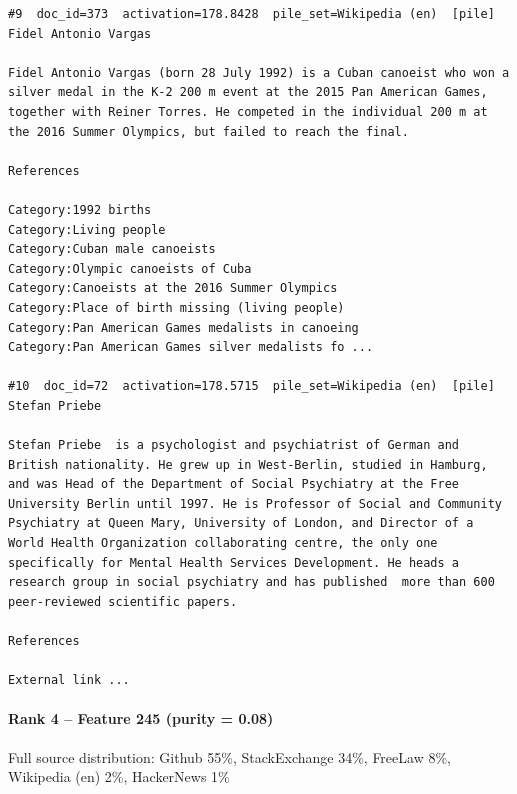 \begin{verbatim}
#9  doc_id=373  activation=178.8428  pile_set=Wikipedia (en)  [pile]
Fidel Antonio Vargas

Fidel Antonio Vargas (born 28 July 1992) is a Cuban canoeist who won a silver medal in the K-2 200 m event at the 2015 Pan American Games, together with Reiner Torres. He competed in the individual 200 m at the 2016 Summer Olympics, but failed to reach the final.

References

Category:1992 births
Category:Living people
Category:Cuban male canoeists
Category:Olympic canoeists of Cuba
Category:Canoeists at the 2016 Summer Olympics
Category:Place of birth missing (living people)
Category:Pan American Games medalists in canoeing
Category:Pan American Games silver medalists fo ...

#10  doc_id=72  activation=178.5715  pile_set=Wikipedia (en)  [pile]
Stefan Priebe

Stefan Priebe  is a psychologist and psychiatrist of German and British nationality. He grew up in West-Berlin, studied in Hamburg, and was Head of the Department of Social Psychiatry at the Free University Berlin until 1997. He is Professor of Social and Community Psychiatry at Queen Mary, University of London, and Director of a World Health Organization collaborating centre, the only one specifically for Mental Health Services Development. He heads a research group in social psychiatry and has published  more than 600 peer-reviewed scientific papers.

References

External link ...

\end{verbatim}

\paragraph*{Rank 4 -- Feature 245 (purity = 0.08)}

Full source distribution: Github 55\%, StackExchange 34\%, FreeLaw 8\%, Wikipedia (en) 2\%, HackerNews 1\%

